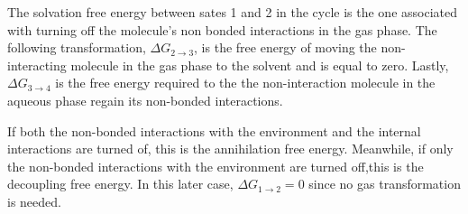 The solvation free energy between sates 1 and 2 in the cycle is the one associated with turning off the molecule's non bonded interactions in the gas phase. The following transformation, $\Delta G_{2 \rightarrow 3}$, is the free energy of moving the non-interacting molecule in the gas phase to the solvent and is equal to zero. Lastly, $\Delta G_{3 \rightarrow 4}$ is the free energy required to the  the non-interaction molecule in the aqueous phase regain its non-bonded interactions.  

If both the non-bonded interactions with the environment and the internal interactions are turned of, this is the annihilation free energy. Meanwhile, if only the non-bonded interactions with the environment are turned off,this is the decoupling free energy. In this later case, $\Delta G_{1 \rightarrow 2} = 0$ since no gas transformation is needed. 

